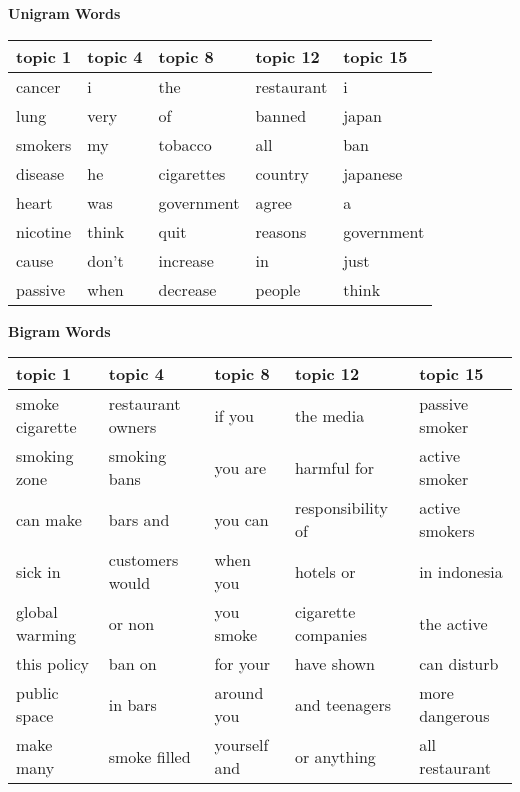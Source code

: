 \begin{figure*}[t]
{\small
\begin{center}
    \textbf{Unigram Words}

    \begin{tabular}{|l|l|l|l|l|}
    \hline
    \textbf{topic 1} & \textbf{topic 4} & \textbf{topic 8} & \textbf{topic 12}
    & \textbf{topic 15} \\
    \hline
    cancer & i & the & restaurant & i \\
    lung   & very & of & banned & japan \\
    smokers & my & tobacco & all & ban \\
    disease & he & cigarettes & country & japanese \\
    heart & was & government & agree & a \\
    nicotine & think & quit & reasons & government \\
    cause & don't & increase & in & just \\
    passive & when & decrease & people & think \\
    \hline
    \end{tabular}

    \vspace{.05in}
    \textbf{Bigram Words}

    \begin{tabular}{|l|l|l|l|l|}
    \hline
    \textbf{topic 1} & \textbf{topic 4} & \textbf{topic 8} & \textbf{topic 12}
    & \textbf{topic 15} \\
    \hline
    smoke cigarette & restaurant owners & if you & the media & passive smoker \\
    smoking zone & smoking bans & you are & harmful for & active smoker \\
    can make & bars and & you can & responsibility of & active smokers \\
    sick in & customers would & when you & hotels or & in indonesia \\
    global warming & or non & you smoke & cigarette companies & the active \\
    this policy & ban on & for your & have shown & can disturb \\
    public space & in bars & around you & and teenagers & more dangerous \\
    make many & smoke filled & yourself and & or anything & all restaurant \\
    \hline
    \end{tabular}


\end{center}}
\end{figure*}
